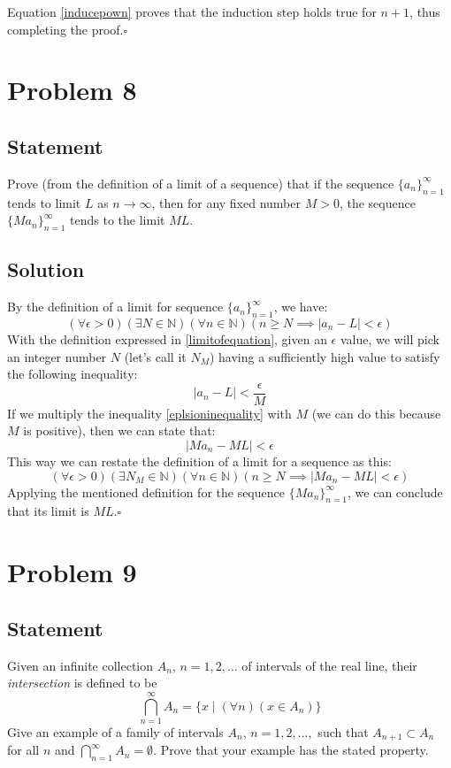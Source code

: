 \documentclass[12pt,letter]{memoir}
\begin{document}
Equation \ref{inducepown} proves that the induction step holds true for $n+1$, thus completing the proof.$\square$

\chapter{Problem 8}
\section*{Statement}
Prove (from the definition of a limit of a sequence) that if the sequence $\{a_{n}\}_{n=1}^{\infty}$ tends to limit $L$ as $n\to\infty$, then for any fixed number $M>0$, the sequence $\{Ma_{n}\}_{n=1}^{\infty}$ tends to the limit $ML$.
\section*{Solution}
By the definition of a limit for sequence $\{a_n\}_{n=1}^{\infty}$, we have:
\begin{equation}\label{limitofequation}
(\forall \epsilon>0)(\exists N \in \mathbb{N})(\forall n \in \mathbb{N})(n \geq N \implies |a_n-L|<\epsilon)
\end{equation}
With the definition expressed in \ref{limitofequation}, given an $\epsilon$ value, we will pick an integer number $N$ (let's call it $N_M$) having a sufficiently high value to satisfy the following inequality:
\begin{equation}\label{eplsioninequality}
|a_n-L|<\frac{\epsilon}{M}
\end{equation}
If we multiply the inequality \ref{eplsioninequality} with $M$ (we can do this because $M$ is positive), then we can state that:
\begin{equation}\label{Meplsioninequality}
|Ma_n-ML|<\epsilon
\end{equation}
This way we can restate the definition of a limit for a sequence as this:
\begin{equation}\label{limitofequation2}
(\forall \epsilon>0)(\exists N_M \in \mathbb{N})(\forall n \in \mathbb{N})(n \geq N \implies |Ma_n-ML|<\epsilon)
\end{equation}
Applying the mentioned definition for the sequence $\{Ma_{n}\}_{n=1}^{\infty}$, we can conclude that its limit is $ML$.$\square$

\chapter{Problem 9}
\section*{Statement}
Given an infinite collection $A_n$, $n=1,2,\dots$ of intervals of the real line, their \emph{intersection} is defined to be
\begin{equation}\label{intersection}
\bigcap\limits_{n=1}^{\infty}A_n=\{x \mid (\forall n)(x \in A_n)\}
\end{equation}
Give an example of a family of intervals $A_n$, $n=1,2,\dots,$ such that $A_{n+1} \subset A_n$ for all $n$ and $\bigcap\limits_{n=1}^{\infty}A_n=\emptyset$. Prove that your example has the stated property.
\end{document}
